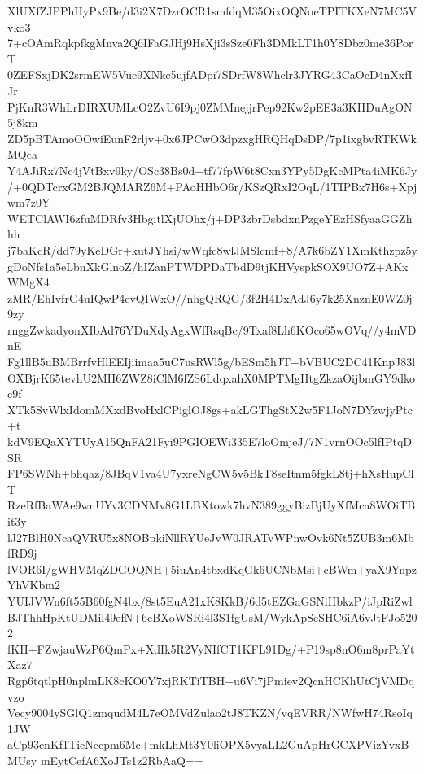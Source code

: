 XlUXfZJPPhHyPx9Be/d3i2X7DzrOCR1smfdqM35OixOQNoeTPITKXeN7MC5Vvko3
7+cOAmRqkpfkgMnva2Q6IFaGJHj9HsXji3sSze0Fh3DMkLT1h0Y8Dbz0me36PorT
0ZEFSxjDK2srmEW5Vuc9XNkc5ujfADpi7SDrfW8Whclr3JYRG43CaOcD4nXxfIJr
PjKnR3WhLrDIRXUMLcO2ZvU6I9pj0ZMMnejjrPep92Kw2pEE3a3KHDuAgON5j8km
ZD5pBTAmoOOwiEunF2rljv+0x6JPCwO3dpzxgHRQHqDsDP/7p1ixgbvRTKWkMQca
Y4AJiRx7Nc4jVtBxv9ky/OSc38Bs0d+tf77fpW6t8Cxn3YPy5DgKcMPta4iMK6Jy
/+0QDTcrxGM2BJQMARZ6M+PAoHHbO6r/KSzQRxI2OqL/1TIPBx7H6s+Xpjwm7z0Y
WETClAWI6zfuMDRfv3HbgitlXjUOhx/j+DP3zbrDsbdxnPzgeYEzHSfyaaGGZhhh
j7baKcR/dd79yKeDGr+kutJYhsi/wWqfc8wlJMSlcmf+8/A7k6bZY1XmKthzpz5y
gDoNfs1a5eLbnXkGlnoZ/hIZanPTWDPDaTbdD9tjKHVyspkSOX9UO7Z+AKxWMgX4
zMR/EhIvfrG4uIQwP4evQIWxO//nhgQRQG/3f2H4DxAdJ6y7k25XnznE0WZ0j9zy
rnggZwkadyonXIbAd76YDuXdyAgxWfRsqBc/9Txaf8Lh6KOco65wOVq//y4mVDnE
Fg1llB5uBMBrrfvHlEEIjiimaa5uC7usRWl5g/bESm5hJT+bVBUC2DC41KnpJ83l
OXBjrK65tevhU2MH6ZWZ8iClM6fZS6LdqxahX0MPTMgHtgZkzaOijbmGY9dkoc9f
XTk5SvWlxIdomMXxdBvoHxlCPiglOJ8gs+akLGThgStX2w5F1JoN7DYzwjyPtc+t
kdV9EQaXYTUyA15QnFA21Fyi9PGIOEWi335E7loOmjeJ/7N1vrnOOc5lfIPtqDSR
FP6SWNh+bhqaz/8JBqV1va4U7yxreNgCW5v5BkT8seItnm5fgkL8tj+hXsHupCIT
RzeRfBaWAe9wnUYv3CDNMv8G1LBXtowk7hvN389ggyBizBjUyXfMca8WOiTBit3y
lJ27BlH0NcaQVRU5x8NOBpkiNllRYUeJvW0JRATvWPnwOvk6Nt5ZUB3m6MbfRD9j
lVOR6I/gWHVMqZDGOQNH+5iuAn4tbxdKqGk6UCNbMsi+cBWm+yaX9YnpzYhVKbm2
YUIJVWn6ft55B60fgN4bx/8st5EuA21xK8KkB/6d5tEZGaGSNiHbkzP/iJpRiZwl
BJThhHpKtUDMil49efN+6cBXoWSRi4l3S1fgUsM/WykApSeSHC6iA6vJtFJo5202
fKH+FZwjauWzP6QmPx+XdIk5R2VyNIfCT1KFL91Dg/+P19sp8nO6m8prPaYtXaz7
Rgp6tqtlpH0nplmLK8cKO0Y7xjRKTiTBH+u6Vi7jPmiev2QcnHCKhUtCjVMDqvzo
Vecy9004ySGlQ1zmqudM4L7eOMVdZulao2tJ8TKZN/vqEVRR/NWfwH74RsoIq1JW
aCp93cnKf1TicNccpm6Mc+mkLhMt3Y0liOPX5vyaLL2GuApHrGCXPVizYvxBMUsy
mEytCefA6XoJTs1z2RbAaQ==

